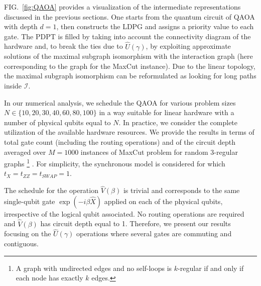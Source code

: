 \documentclass[%
onecolumn,pra,
superscriptaddress,
nofootinbib,
 amsmath,amssymb,
 aps,
11pt,
]{revtex4-1}
\begin{document}
FIG.~\ref{fig:QAOA} provides a visualization of the intermediate representations discussed in the previous sections. One starts from the quantum circuit of QAOA with depth $d=1$, then constructs the LDPG and assigns a priority value to each gate. The PDPT is filled by taking into account the connectivity diagram of the hardware and, to break the ties due to $\hat{U}(\gamma)$, by exploiting approximate solutions of the maximal subgraph isomorphism with the interaction graph (here corresponding to the graph for the MaxCut instance). Due to the linear topology, the maximal subgraph isomorphism can be reformulated as looking for long paths inside $\mathcal{I}$.

In our numerical analysis, we schedule the QAOA for various problem sizes $N\in\{10, 20, 30, 40, 60, 80, 100\}$ in a way suitable for linear hardware with a number of physical qubits equal to $N$. In practice, we consider the complete utilization of the available hardware resources.
We provide the results in terms of total gate count (including the routing operations) and of the circuit depth averaged over $M=1000$ instances of MaxCut problem for random 3-regular graphs%
\footnote{A graph with undirected edges and no self-loops is $k$-regular if and only if each node has exactly $k$ edges.}%
. For simplicity, the synchronous model is considered for which $t_X=t_{ZZ}=t_{SWAP}=1$.

The schedule for the operation $\hat{V}(\beta)$ is trivial and corresponds to the same single-qubit gate $\exp{(-i \beta  \hat{X})}$ applied on each of the physical qubits, irrespective of the logical qubit associated. No routing operations are required and $\hat{V}(\beta)$ has circuit depth equal to 1. Therefore, we present our results focusing on the $\hat{U}(\gamma)$ operations where several gates are commuting and contiguous.
\end{document}
